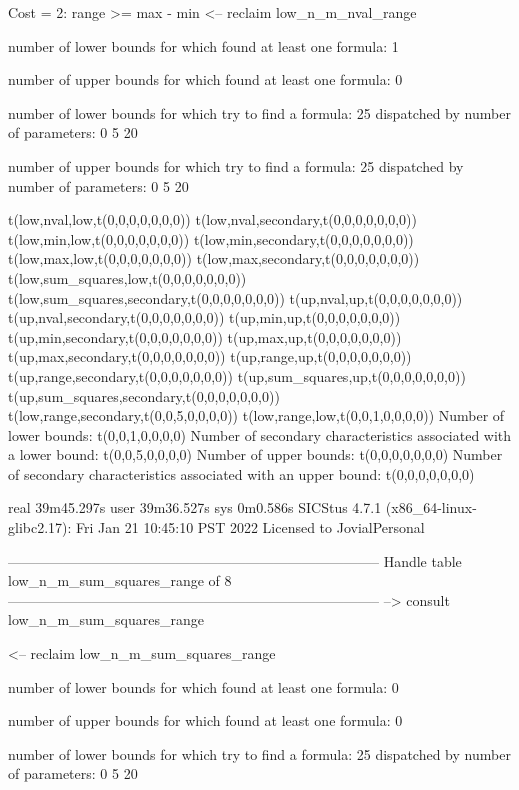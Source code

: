 Cost =  2:  range >= max - min
<-- reclaim low_n_m_nval_range

number of lower bounds for which found at least one formula: 1

number of upper bounds for which found at least one formula: 0

number of lower bounds for which try to find a formula: 25
dispatched by number of parameters: 0  5  20

number of upper bounds for which try to find a formula: 25
dispatched by number of parameters: 0  5  20

t(low,nval,low,t(0,0,0,0,0,0,0))
t(low,nval,secondary,t(0,0,0,0,0,0,0))
t(low,min,low,t(0,0,0,0,0,0,0))
t(low,min,secondary,t(0,0,0,0,0,0,0))
t(low,max,low,t(0,0,0,0,0,0,0))
t(low,max,secondary,t(0,0,0,0,0,0,0))
t(low,sum_squares,low,t(0,0,0,0,0,0,0))
t(low,sum_squares,secondary,t(0,0,0,0,0,0,0))
t(up,nval,up,t(0,0,0,0,0,0,0))
t(up,nval,secondary,t(0,0,0,0,0,0,0))
t(up,min,up,t(0,0,0,0,0,0,0))
t(up,min,secondary,t(0,0,0,0,0,0,0))
t(up,max,up,t(0,0,0,0,0,0,0))
t(up,max,secondary,t(0,0,0,0,0,0,0))
t(up,range,up,t(0,0,0,0,0,0,0))
t(up,range,secondary,t(0,0,0,0,0,0,0))
t(up,sum_squares,up,t(0,0,0,0,0,0,0))
t(up,sum_squares,secondary,t(0,0,0,0,0,0,0))
t(low,range,secondary,t(0,0,5,0,0,0,0))
t(low,range,low,t(0,0,1,0,0,0,0))
Number of lower bounds:                                             t(0,0,1,0,0,0,0)
Number of secondary characteristics associated with a lower bound:  t(0,0,5,0,0,0,0)
Number of upper bounds:                                             t(0,0,0,0,0,0,0)
Number of secondary characteristics associated with an upper bound: t(0,0,0,0,0,0,0)

real	39m45.297s
user	39m36.527s
sys	0m0.586s
SICStus 4.7.1 (x86_64-linux-glibc2.17): Fri Jan 21 10:45:10 PST 2022
Licensed to JovialPersonal


--------------------------------------------------------------------------------
Handle table low_n_m_sum_squares_range of 8
--------------------------------------------------------------------------------
--> consult low_n_m_sum_squares_range

<-- reclaim low_n_m_sum_squares_range

number of lower bounds for which found at least one formula: 0

number of upper bounds for which found at least one formula: 0

number of lower bounds for which try to find a formula: 25
dispatched by number of parameters: 0  5  20

